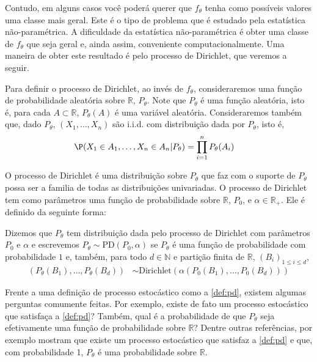 Contudo, em alguns casos você poderá querer
que $f_{\theta}$ tenha como possíveis valores
uma classe mais geral.
Este é o tipo de problema que é estudado pela
estatística não-paramétrica.
A dificuldade da estatística não-paramétrica é
obter uma classe de $f_{\theta}$ que 
seja geral e, ainda assim, 
conveniente computacionalmente.
Uma maneira de obter este resultado é
pelo processo de Dirichlet, que
veremos a seguir.

Para definir o processo de Dirichlet,
ao invés de $f_{\theta}$, consideraremos
uma função de probabilidade aleatória
sobre $\mathbb{R}$, $P_{\theta}$.
Note que $P_{\theta}$ é uma função aleatória,
isto é, para cada $A \subset \mathbb{R}$,
$P_{\theta}(A)$ é uma variável aleatória.
Consideraremos também que, dado $P_{\theta}$,
$(X_1,\ldots,X_n)$ são i.i.d. com
distribuição dada por $P_{\theta}$, isto é,
\begin{align}
 \label{eq:pd-1}
 \P(X_1 \in A_1, \ldots, X_n \in A_n|P_{\theta})
 &= \prod_{i=1}^{n}P_{\theta}(A_i)
\end{align}

O processo de Dirichlet é 
uma distribuição sobre $P_{\theta}$ que 
faz com o suporte de $P_{\theta}$ possa ser
a familia de todas as distribuições univariadas.
O processo de Dirichlet tem como parâmetros
uma função de probabilidade sobre $\mathbb{R}$,
$P_0$, e $\alpha \in \mathbb{R}_{+}$. 
Ele é definido da seguinte forma:

\begin{definition}
 \label{def:pd}
 Dizemos que $P_{\theta}$ tem distribuição dada
 pelo processo de Dirichlet com parâmetros
 $P_0$ e $\alpha$ e escrevemos
 $P_{\theta} \sim \text{PD}(P_0, \alpha)$ se
 $P_{\theta}$ é uma função de probabilidade 
 com probabilidade $1$ e, também,
 para todo $d \in \mathbb{N}$ e
 partição finita de $\mathbb{R}$,
 $(B_i)_{1 \leq i \leq d}$,
 \begin{align*}
  (P_{\theta}(B_1), \ldots,P_{\theta}(B_d))
  & \sim \text{Dirichlet}
  (\alpha(P_0(B_1),\ldots, P_0(B_d)))
 \end{align*}
\end{definition}

Frente a uma definição de
processo estocástico como a \cref{def:pd},
existem algumas perguntas comumente feitas.
Por exemplo, existe de fato 
um processo estocástico que satisfaça
a \cref{def:pd}?
Também, qual é a probabilidade de que
$P_{\theta}$ seja efetivamente
uma função de probabilidade sobre $\mathbb{R}$?
Dentre outras referências, por exemplo
\citep{Ferguson1973,Sethuraman1994} mostram que
existe um processo estocástico que
satisfaz a \cref{def:pd} e que, 
com probabilidade 1, $P_{\theta}$ é
uma probabilidade sobre $\mathbb{R}$.

